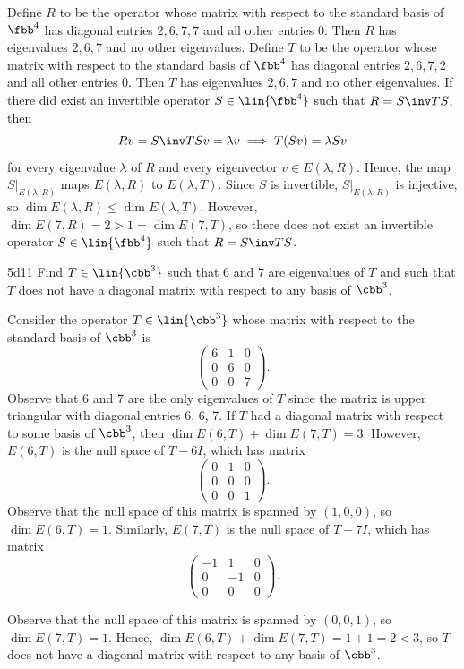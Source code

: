 \begin{sol}
    Define $R$ to be the operator whose matrix with respect to the standard basis of $\fbb^4$ has diagonal entries $2, 6, 7, 7$ and all other entries $0$.
    Then $R$ has eigenvalues $2, 6, 7$ and no other eigenvalues.
    Define $T$ to be the operator whose matrix with respect to the standard basis of $\fbb^4$ has diagonal entries $2, 6, 7, 2$ and all other entries $0$.
    Then $T$ has eigenvalues $2, 6, 7$ and no other eigenvalues.
    If there did exist an invertible operator $S \in \lin{\fbb^4}$ such that $R = S\inv T S$, then
    \[
        Rv = S\inv T S v = \lambda v \implies T(Sv) = \lambda Sv
    \]
    for every eigenvalue $\lambda$ of $R$ and every eigenvector $v \in E(\lambda, R)$.
    Hence, the map $S|_{E(\lambda, R)}$ maps $E(\lambda, R)$ to $E(\lambda, T)$.
    Since $S$ is invertible, $S|_{E(\lambda, R)}$ is injective, so $\dim E(\lambda, R) \leq \dim E(\lambda, T)$.
    However, $\dim E(7, R) = 2 > 1 = \dim E(7, T)$, so there does not exist an invertible operator $S \in \lin{\fbb^4}$ such that $R = S\inv T S$.
\end{sol}

\begin{exercise}{5d11}
    Find $T \in \lin{\cbb^3}$ such that $6$ and $7$ are eigenvalues of $T$ and such that $T$ does not have a diagonal matrix with respect to any basis of $\cbb^3$.
\end{exercise}

\begin{sol}
    Consider the operator $T \in \lin{\cbb^3}$ whose matrix with respect to the standard basis of $\cbb^3$ is
    \[
        \begin{pmatrix}
            6 & 1 & 0 \\
            0 & 6 & 0 \\
            0 & 0 & 7
        \end{pmatrix}.
    \]
    Observe that 6 and 7 are the only eigenvalues of $T$ since the matrix is upper triangular with diagonal entries 6, 6, 7.
    If $T$ had a diagonal matrix with respect to some basis of $\cbb^3$, then $\dim E(6, T) + \dim E(7, T) = 3$.
    However, $E(6, T)$ is the null space of $T - 6I$, which has matrix
    \[
        \begin{pmatrix}
            0 & 1 & 0 \\
            0 & 0 & 0 \\
            0 & 0 & 1
        \end{pmatrix}.
    \]
    Observe that the null space of this matrix is spanned by $(1, 0, 0)$, so $\dim E(6, T) = 1$.
    Similarly, $E(7, T)$ is the null space of $T - 7I$, which has matrix
    \[
        \begin{pmatrix}
            -1 & 1 & 0 \\
            0 & -1 & 0 \\
            0 & 0 & 0
        \end{pmatrix}.
    \]

    Observe that the null space of this matrix is spanned by $(0, 0, 1)$, so $\dim E(7, T) = 1$.
    Hence, $\dim E(6, T) + \dim E(7, T) = 1 + 1 = 2 < 3$, so $T$ does not have a diagonal matrix with respect to any basis of $\cbb^3$.
\end{sol}

